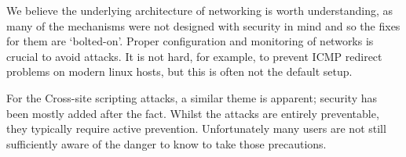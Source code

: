 We believe the underlying architecture of networking is worth understanding, as many of the mechanisms were not
designed with security in mind and so the fixes for them are `bolted-on'. Proper configuration and monitoring
of networks is crucial to avoid attacks. It is not hard, for example, to prevent ICMP redirect problems on
modern linux hosts\cite{sysctl}, but this is often not the default setup.

For the Cross-site scripting attacks, a similar theme is apparent; security has been mostly added after the fact.
Whilst the attacks are entirely preventable, they typically require active prevention. Unfortunately many users
are not still sufficiently aware of the danger to know to take those precautions.

